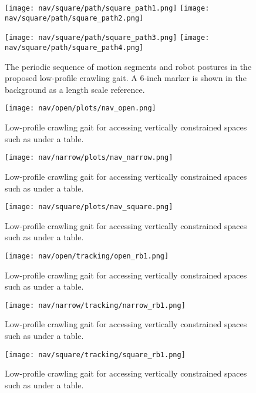 \begin{figure}
  \centerline{
    \texttt{[image: nav/square/path/square\_path1.png]}
    \texttt{[image: nav/square/path/square\_path2.png]}
  }
  \vspace*{0.05in}
  \centerline{
    \texttt{[image: nav/square/path/square\_path3.png]}
    \texttt{[image: nav/square/path/square\_path4.png]}
  }
    \caption{The periodic sequence of motion segments and robot postures in the proposed low-profile crawling gait. A 6-inch marker is shown in the background as a length scale reference.}
    \label{fig:nav_square_frames1}
        \vspace*{-0.07in}
\end{figure}

\begin{figure}
  \texttt{[image: nav/open/plots/nav\_open.png]}
  \caption{Low-profile crawling gait for accessing vertically constrained spaces such as under a table.}
  \label{fig:nav_open_plot1}
\end{figure}

\begin{figure}
  \texttt{[image: nav/narrow/plots/nav\_narrow.png]}
  \caption{Low-profile crawling gait for accessing vertically constrained spaces such as under a table.}
  \label{fig:nav_narrow_plot1}
\end{figure}

\begin{figure}
  \texttt{[image: nav/square/plots/nav\_square.png]}
  \caption{Low-profile crawling gait for accessing vertically constrained spaces such as under a table.}
  \label{fig:nav_square_plot1}
\end{figure}

\begin{figure}
  \texttt{[image: nav/open/tracking/open\_rb1.png]}
  \caption{Low-profile crawling gait for accessing vertically constrained spaces such as under a table.}
  \label{fig:nav_open_plot1}
\end{figure}

\begin{figure}
  \texttt{[image: nav/narrow/tracking/narrow\_rb1.png]}
  \caption{Low-profile crawling gait for accessing vertically constrained spaces such as under a table.}
  \label{fig:nav_narrow_plot1}
\end{figure}

\begin{figure}
  \texttt{[image: nav/square/tracking/square\_rb1.png]}
  \caption{Low-profile crawling gait for accessing vertically constrained spaces such as under a table.}
  \label{fig:nav_square_plot1}
\end{figure}